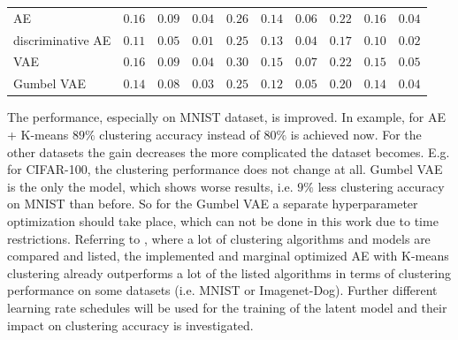 \documentclass[12pt,DIV14,BCOR12mm,a4paper,footexclude,headinclude,halfparskip-,twoside,openright,cleardoubleempty,idxtotoc,bibtotoc,listtotoc,abstracton]{scrreprt} %
\numberwithin{equation}{chapter}
\begin{document}
\begin{table}[htb!]
\begin{tabular}{l|ccccccccc}
        		\midrule
    			AE & $\mathbf{0.16}$ & $\mathbf{0.09}$ & $\mathbf{0.04}$ & $0.26$ & $0.14$ & $0.06$ & $\mathbf{0.22}$ & $\mathbf{0.16}$ & $0.04$\\
        		discriminative AE & $0.11$ & $0.05$ & $0.01$ & $0.25$ & $0.13$ & $0.04$ & $0.17$ & $0.10$ & $0.02$\\
        		VAE & $\mathbf{0.16}$ & $\mathbf{0.09}$ & $\mathbf{0.04}$ & $\mathbf{0.30}$ & $\mathbf{0.15}$ & $\mathbf{0.07}$ & $\mathbf{0.22}$ & $0.15$ & $\mathbf{0.05}$\\
        		Gumbel VAE & $0.14$ & $0.08$ & $0.03$ & $0.25$ & $0.12$ & $0.05$ & $0.20$ & $0.14$ & $0.04$\\
        		\bottomrule
    		\end{tabular}
	\end{table}
The performance, especially on MNIST dataset, is improved. In example, for AE + K-means $89\%$ clustering accuracy instead of $80\%$ is achieved now. For the other datasets the gain decreases the more complicated the dataset becomes. E.g. for CIFAR-100, the clustering performance does not change at all. Gumbel VAE is the only the model, which shows worse results, i.e. $9\%$ less clustering accuracy on MNIST than before. So for the Gumbel VAE a separate hyperparameter optimization should take place, which can not be done in this work due to time restrictions. Referring to \cite{Chang17DAC}, where a lot of clustering algorithms and models are compared and listed, the implemented and marginal optimized AE with K-means clustering already outperforms a lot of the listed algorithms in terms of clustering performance on some datasets (i.e. MNIST or Imagenet-Dog). Further different learning rate schedules will be used for the training of the latent model and their impact on clustering accuracy is investigated.
\end{document}
